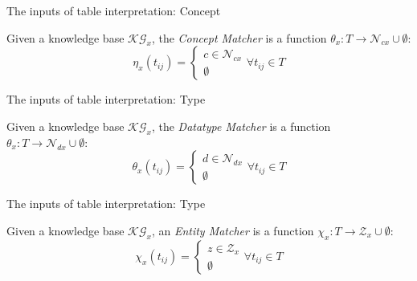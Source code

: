 \documentclass{beamer}
\begin{document}
\begin{frame}{The inputs of table interpretation: Concept}
	\begin{definition}
		Given a knowledge base $\mathcal{KG}_x$, the \textit{Concept Matcher} is a function $\theta_x: T \to \mathcal{N}_{cx} \cup \emptyset$:
		\begin{equation}
			\eta_x(t_{ij})=
			\begin{cases}
				c\in\mathcal{N}_{cx}
				\\
				\emptyset
			\end{cases}
			\forall t_{ij} \in T
		\end{equation}
	\end{definition}
\end{frame}


\begin{frame}{The inputs of table interpretation: Type}
	\begin{definition}
		Given a knowledge base $\mathcal{KG}_x$, the \textit{Datatype Matcher} is a function $\theta_x: T \to \mathcal{N}_{dx} \cup \emptyset$:
		\begin{equation}
			\theta_x(t_{ij})=
			\begin{cases}
				d\in\mathcal{N}_{dx}
				\\
				\emptyset
			\end{cases}
			\forall t_{ij} \in T
		\end{equation}
	\end{definition}
\end{frame}


\begin{frame}{The inputs of table interpretation: Type}
	\begin{definition} Given a knowledge base $\mathcal{KG}_x$, an \textit{Entity Matcher} is a function $\chi_x: T \to \mathcal{Z}_x \cup \emptyset$:
		\begin{equation}
			\chi_x(t_{ij})=
			\begin{cases}
				z\in\mathcal{Z}_x
				\\
				\emptyset
			\end{cases}
			\forall t_{ij} \in T
		\end{equation}
	\end{definition}
\end{frame}


\usetikzlibrary{arrows,automata}
\end{document}
